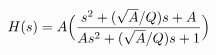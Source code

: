 \hsize 0pt
\vsize 0pt
\nopagenumbers
\overfullrule 0pt
\noindent
$$
H(s) = A \Bigl({s^2 + ({\sqrt{A} / Q})s + A \over
As^2 + ({\sqrt{A}/Q})s + 1}\Bigr)
$$
\bye